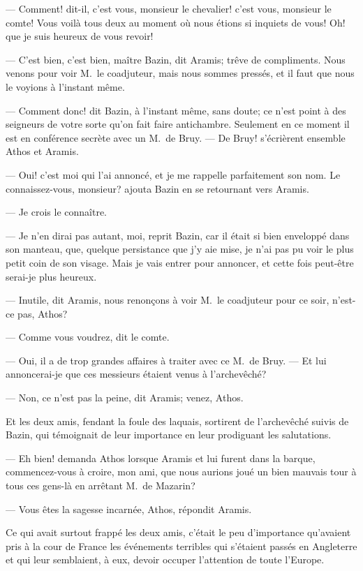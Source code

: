 — Comment! dit-il, c'est vous, monsieur le chevalier! c'est vous, monsieur le comte! Vous voilà tous deux au moment où nous étions si inquiets de vous! Oh! que je suis heureux de vous revoir!

— C'est bien, c'est bien, maître Bazin, dit Aramis; trêve de compliments. Nous venons pour voir M.~le coadjuteur, mais nous sommes pressés, et il faut que nous le voyions à l'instant même.

— Comment donc! dit Bazin, à l'instant même, sans doute; ce n'est point à des seigneurs de votre sorte qu'on fait faire antichambre.
Seulement en ce moment il est en conférence secrète avec un M.~de Bruy.
— De Bruy! s'écrièrent ensemble Athos et Aramis.

— Oui! c'est moi qui l'ai annoncé, et je me rappelle parfaitement son nom. Le connaissez-vous, monsieur? ajouta Bazin en se retournant vers Aramis.

— Je crois le connaître.

— Je n'en dirai pas autant, moi, reprit Bazin, car il était si bien enveloppé dans son manteau, que, quelque persistance que j'y aie mise, je n'ai pas pu voir le plus petit coin de son visage. Mais je vais entrer pour annoncer, et cette fois peut-être serai-je plus heureux.

— Inutile, dit Aramis, nous renonçons à voir M.~le coadjuteur pour ce soir, n'est-ce pas, Athos?

— Comme vous voudrez, dit le comte.

— Oui, il a de trop grandes affaires à traiter avec ce M.~de Bruy.
— Et lui annoncerai-je que ces messieurs étaient venus à l'archevêché?

— Non, ce n'est pas la peine, dit Aramis; venez, Athos.

Et les deux amis, fendant la foule des laquais, sortirent de l'archevêché suivis de Bazin, qui témoignait de leur importance en leur prodiguant les salutations.

— Eh bien! demanda Athos lorsque Aramis et lui furent dans la barque, commencez-vous à croire, mon ami, que nous aurions joué un bien mauvais tour à tous ces gens-là en arrêtant M.~de Mazarin?

— Vous êtes la sagesse incarnée, Athos, répondit Aramis.

Ce qui avait surtout frappé les deux amis, c'était le peu d'importance qu'avaient pris à la cour de France les événements terribles qui s'étaient passés en Angleterre et qui leur semblaient, à eux, devoir occuper l'attention de toute l'Europe.

